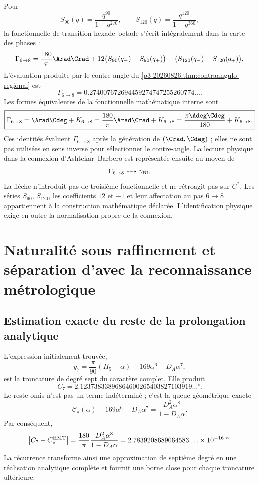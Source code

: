 Pour
\[
S_{90}(q)=\frac{q^{90}}{1-q^{270}},
\qquad
S_{120}(q)=\frac{q^{120}}{1-q^{360}},
\]
la fonctionnelle de transition hexade--octade s'écrit intégralement dans la
carte des phases :
\[
\Gamma_{6\to8}
=\frac{180}{\pi}\Arad\Crad
+12\bigl(S_{90}(q_-)-S_{90}(q_+)\bigr)
-\bigl(S_{120}(q_-)-S_{120}(q_+)\bigr).
\]
L'évaluation produite par le contre-angle du
\cref{p3-20260826:thm:contraangulo-regional} est
\[
\boxed{
\Gamma_{6\to8}
=0.274007672694459274747255260774\ldots.}
\]
Les formes équivalentes de la fonctionnelle mathématique interne sont
\[
\boxed{
\Gamma_{6\to8}
=\Arad\Cdeg+K_{6\to8}
=\frac{180}{\pi}\Arad\Crad+K_{6\to8}
=\frac{\pi\Adeg\Cdeg}{180}+K_{6\to8}.}
\]
Ces identités évaluent \(\Gamma_{6\to8}\) après la génération de
\((\Crad,\Cdeg)\) ; elles ne sont pas utilisées en sens inverse pour sélectionner le
contre-angle. La lecture physique dans la connexion d'Ashtekar--Barbero est
représentée ensuite au moyen de
\[
 \Gamma_{6\to8}\dashrightarrow\gamma_{\rm BI}.
\]
La flèche n'introduit pas de troisième fonctionnelle et ne rétroagit pas sur \(C^*\). Les
séries \(S_{90}\), \(S_{120}\), les coefficients \(12\) et \(-1\) et leur
affectation au pas \(6\to8\) appartiennent à la construction mathématique
déclarée. L'identification physique exige en outre la normalisation propre
de la connexion.

\section{Naturalité sous raffinement et séparation d'avec la reconnaissance métrologique}
\label{sec:s102:c38:7}

\subsection{Estimation exacte du reste de la prolongation analytique}
\label{sec:s102:c38:7:1}


L'expression initialement trouvée,
\[
y_7=\frac\pi{90}(H_5+\alpha)-169\alpha^6-D_A\alpha^7,
\]
est la troncature de degré sept du caractère complet. Elle produit
\[
C_7=2.12373833896864600265403827103919\ldots{}^\circ.
\]
Le reste omis n'est pas un terme indéterminé ; c'est la queue géométrique
exacte
\[
\mathscr C_\pi(\alpha)
-169\alpha^6-D_A\alpha^7
=\frac{D_A^2\alpha^8}{1-D_A\alpha}.
\]
Par conséquent,
\[
\left|C_7-C_*^{\rm HMT}\right|
=\frac{180}{\pi}\frac{D_A^2\alpha^8}{1-D_A\alpha}
=2.7839208689064583\ldots\times10^{-16}\;{}^\circ.
\]
La récurrence transforme ainsi une approximation de septième degré en une
réalisation analytique complète et fournit une borne close pour chaque
troncature ultérieure.

